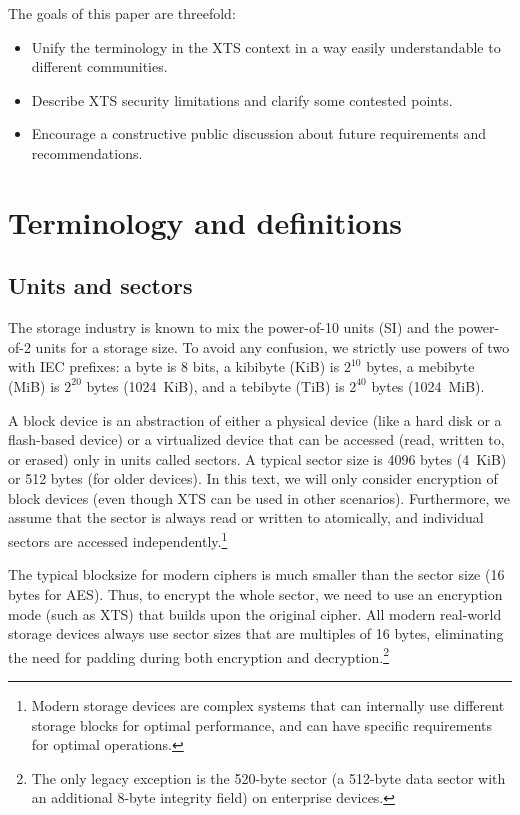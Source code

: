 \documentclass[a4paper]{article}
\begin{document}
The goals of this paper are threefold:
\begin{itemize}
    \item Unify the terminology in the XTS context in a way easily understandable to different communities.
    \item Describe XTS security limitations and clarify some contested points.
    \item Encourage a constructive public discussion about future requirements and recommendations.
\end{itemize}

\section{Terminology and definitions}

\subsection{Units and sectors}\label{hardware}
The storage industry is known to mix the power-of-10 units (SI) and the power-of-2 units for a storage size. To avoid any confusion, we strictly use powers of two with IEC prefixes: a byte is 8 bits, a kibibyte (KiB) is $2^{10}$ bytes, a mebibyte (MiB) is $2^{20}$ bytes (1024~KiB), and a tebibyte (TiB) is $2^{40}$ bytes (1024~MiB).

A block device is an abstraction of either a physical device (like a hard disk or a flash-based device) or a virtualized device that can be accessed (read, written to, or erased) only in units called sectors. A typical sector size is 4096 bytes (4~KiB) or 512 bytes (for older devices).
In this text, we will only consider encryption of block devices (even though XTS can be used in other scenarios). 
Furthermore, we assume that the sector is always read or written to atomically, and individual sectors are accessed independently.\footnote{Modern storage devices are complex systems that can internally use different storage blocks for optimal performance, and can have specific requirements for optimal operations.}

The typical blocksize for modern ciphers is much smaller than the sector size (16 bytes for AES). 
Thus, to encrypt the whole sector, we need to use an encryption mode (such as XTS) that builds upon the original cipher. All modern real-world storage devices always use sector sizes that are multiples of 16 bytes, eliminating the need for padding during both encryption and decryption.\footnote{The only legacy exception is the 520-byte sector (a 512-byte data sector with an additional 8-byte integrity field) on enterprise devices.}
\end{document}
